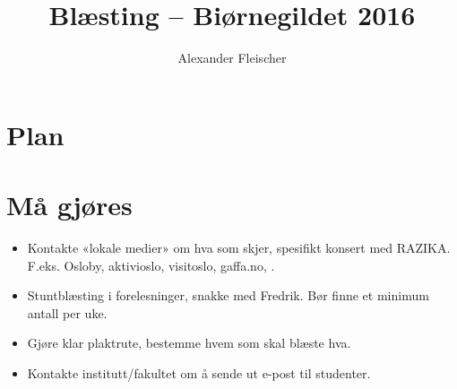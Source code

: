 \documentclass{article}[12pt]
\begin{document}
\title{Blæsting -- Biørnegildet 2016}
\author{Alexander Fleischer}
\maketitle
\tableofcontents
\newpage
\section{Plan}
\section{Må gjøres}
\begin{itemize}
    \item Kontakte «lokale medier» om hva som skjer, spesifikt konsert med 
        RAZIKA. F.eks. Osloby, aktivioslo, visitoslo, gaffa.no, .
    \item Stuntblæsting i forelesninger, snakke med Fredrik. Bør finne et
        minimum antall per uke.
    \item Gjøre klar plaktrute, bestemme hvem som skal blæste hva.
    \item Kontakte institutt/fakultet om å sende ut e-post til studenter.
\end{itemize}
\end{document}
